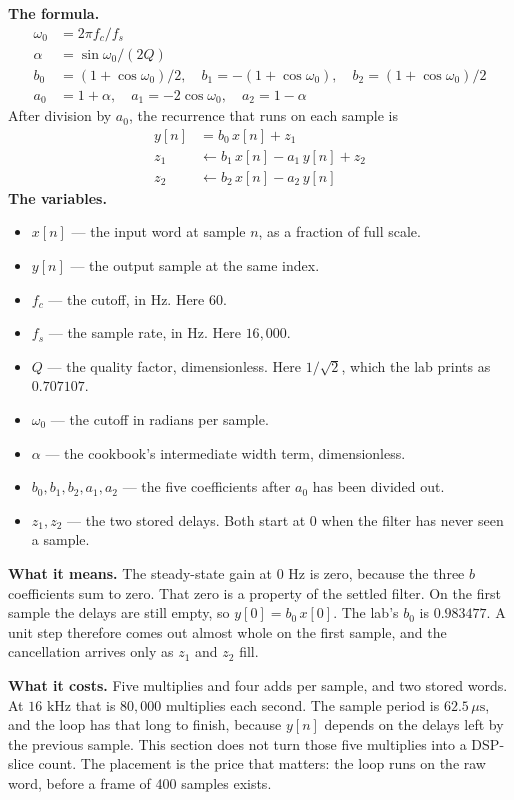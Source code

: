 \documentclass[11pt,a4paper]{article}
\begin{document}
\begin{equationcard}
\textbf{The formula.}
\begin{align*}
\omega_0 &= 2\pi f_c / f_s \\
\alpha &= \sin\omega_0 / (2Q) \\
b_0 &= (1+\cos\omega_0)/2, \quad b_1 = -(1+\cos\omega_0), \quad b_2 = (1+\cos\omega_0)/2 \\
a_0 &= 1+\alpha, \quad a_1 = -2\cos\omega_0, \quad a_2 = 1-\alpha
\end{align*}
After division by $a_0$, the recurrence that runs on each sample is
\begin{align*}
y[n] &= b_0\, x[n] + z_1 \\
z_1 &\leftarrow b_1\, x[n] - a_1\, y[n] + z_2 \\
z_2 &\leftarrow b_2\, x[n] - a_2\, y[n]
\end{align*}
\textbf{The variables.}
\begin{itemize}\setlength{\itemsep}{1pt}
    \item $x[n]$ --- the input word at sample $n$, as a fraction of full scale.
    \item $y[n]$ --- the output sample at the same index.
    \item $f_c$ --- the cutoff, in Hz. Here $60$.
    \item $f_s$ --- the sample rate, in Hz. Here $16{,}000$.
    \item $Q$ --- the quality factor, dimensionless. Here $1/\sqrt{2}$, which the lab prints as $0.707107$.
    \item $\omega_0$ --- the cutoff in radians per sample.
    \item $\alpha$ --- the cookbook's intermediate width term, dimensionless.
    \item $b_0, b_1, b_2, a_1, a_2$ --- the five coefficients after $a_0$ has been divided out.
    \item $z_1, z_2$ --- the two stored delays. Both start at $0$ when the filter has never seen a sample.
\end{itemize}
\textbf{What it means.} The steady-state gain at $0\text{ Hz}$ is zero, because the three $b$ coefficients sum to zero. That zero is a property of the settled filter. On the first sample the delays are still empty, so $y[0] = b_0\, x[0]$. The lab's $b_0$ is $0.983477$. A unit step therefore comes out almost whole on the first sample, and the cancellation arrives only as $z_1$ and $z_2$ fill.

\textbf{What it costs.} Five multiplies and four adds per sample, and two stored words. At $16\text{ kHz}$ that is $80{,}000$ multiplies each second. The sample period is $62.5\,\mu\text{s}$, and the loop has that long to finish, because $y[n]$ depends on the delays left by the previous sample. This section does not turn those five multiplies into a DSP-slice count. The placement is the price that matters: the loop runs on the raw word, before a frame of 400 samples exists.


\end{equationcard}
\end{document}
